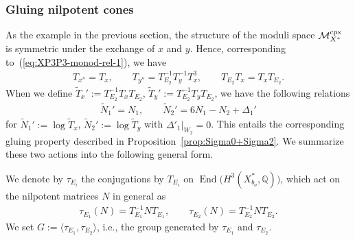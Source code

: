\documentclass[pdftex]{sigma}
\numberwithin{equation}{section}
\begin{document}
\subsubsection{Gluing nilpotent cones} As the example in the previous section, the structure of the moduli space $\mathcal{M}_{X^{*}}^{\rm cpx}$ is
symmetric under the exchange of $x$ and $y$. Hence, corresponding to~(\ref{eq:XP3P3-monod-rel-1}), we have
\begin{gather}
\boxed{T_{x''}=T_{x},\qquad T_{y''}=T_{E_{2}}^{-1}T_{y}^{-1}T_{x}^{3},\qquad T_{E_{2}}T_{x}=T_{x}T_{E_{2}}.}\label{eq:XP3P3-monod-rel-2}
\end{gather}
When we define $\tilde{T}_{x}':=T_{E_{2}}^{-1}T_{x}T_{E_{2}}$, $\tilde{T}_{y}':=T_{E_{2}}^{-1}T_{y}T_{E_{2}}$,
we have the following relations
\begin{gather*}
\tilde{N}_{1}'=N_{1},\qquad \tilde{N}_{2}'=6N_{1}-N_{2}+\Delta_{1}'
\end{gather*}
for $\tilde{N}_{1}':=\log\tilde{T}_{x}$, $\tilde{N}_{2}':=\log\tilde{T}_{y}$ with $\Delta'_{1}\vert_{W_{2}}=0$. This entails the corresponding
gluing property described in Proposition~\ref{prop:Sigma0+Sigma2}. We summarize these two actions into the following general form.
\begin{Definition}
We denote by $\tau_{E_{i}}$ the conjugations by $T_{E_{i}}$ on $\operatorname{End}\big(H^{3}(X_{b_{o}}^{*},\mathbb{Q})\big)$,
which act on the nilpotent matrices $N$ in general as
\begin{gather*}
\tau_{E_{1}}(N)=T_{E_{1}}^{-1}NT_{E_{1}},\qquad \tau_{E_{2}}(N)=T_{E_{2}}^{-1}NT_{E_{2}}.
\end{gather*}
We set $G:=\langle\tau_{E_{1}},\tau_{E_{2}}\rangle$, i.e., the group generated by $\tau_{E_{1}}$ and $\tau_{E_{2}}$.
\end{Definition}
\end{document}
